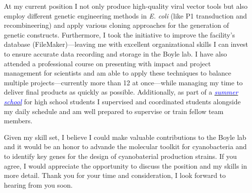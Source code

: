 \documentclass[11pt,a4paper,sans]{moderncv}
\begin{document}
\begin{spacing}{1.1}
At my current position I not only produce high-quality viral vector tools but also employ different genetic engineering methods in \textit{E. coli} (like P1 transduction and recombineering) and apply various cloning approaches for the generation of genetic constructs.
Furthermore, I took the initiative to improve the facility's database (FileMaker)---leaving me with excellent organizational skills I can invest to ensure accurate data recording and storage in the Boyle lab.
I have also attended a professional course on presenting with impact and project management for scientists and am able to apply these techniques to balance multiple projects---currently more than 12 at once---while managing my time to deliver final products as quickly as possible.  
Additionally, as part of a {\href{https://adamascienza.com/summer-in-science/}{\textcolor{blue}{\textit{summer school}}}} for high school students I supervised and coordinated students alongside my daily schedule and am well prepared to supervise or train fellow team members. \par%

Given my skill set, I believe I could make valuable contributions to the Boyle lab and it would be an honor to advande the molecular toolkit for cyanobacteria and to identify key genes for the design of cyanobaterial production strains.
If you agree, I would appreciate the opportunity to discuss the position and my skills in more detail. 
Thank you for your time and consideration, I look forward to hearing from you soon.


 

\end{spacing}
\makeletterclosing
\end{document}
